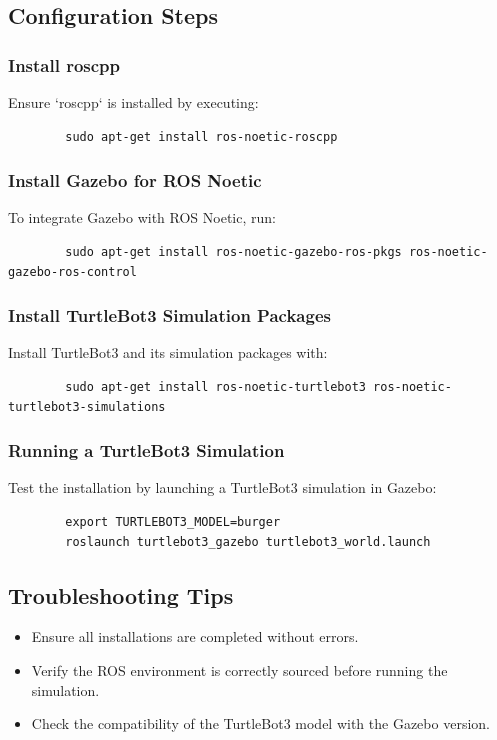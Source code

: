 \documentclass[12pt,a4paper]{article}
\begin{document}
	\subsection{Configuration Steps}
	\subsubsection{Install roscpp}
	Ensure `roscpp` is installed by executing:
	\begin{verbatim}
		sudo apt-get install ros-noetic-roscpp
	\end{verbatim}
	
	\subsubsection{Install Gazebo for ROS Noetic}
	To integrate Gazebo with ROS Noetic, run:
	\begin{verbatim}
		sudo apt-get install ros-noetic-gazebo-ros-pkgs ros-noetic-gazebo-ros-control
	\end{verbatim}
	
	\subsubsection{Install TurtleBot3 Simulation Packages}
	Install TurtleBot3 and its simulation packages with:
	\begin{verbatim}
		sudo apt-get install ros-noetic-turtlebot3 ros-noetic-turtlebot3-simulations
	\end{verbatim}
	
	\subsubsection{Running a TurtleBot3 Simulation}
	Test the installation by launching a TurtleBot3 simulation in Gazebo:
	\begin{verbatim}
		export TURTLEBOT3_MODEL=burger
		roslaunch turtlebot3_gazebo turtlebot3_world.launch
	\end{verbatim}
	
	\subsection{Troubleshooting Tips}
	\begin{itemize}
		\item Ensure all installations are completed without errors.
		\item Verify the ROS environment is correctly sourced before running the simulation.
		\item Check the compatibility of the TurtleBot3 model with the Gazebo version.
	\end{itemize}
	
\end{document}
